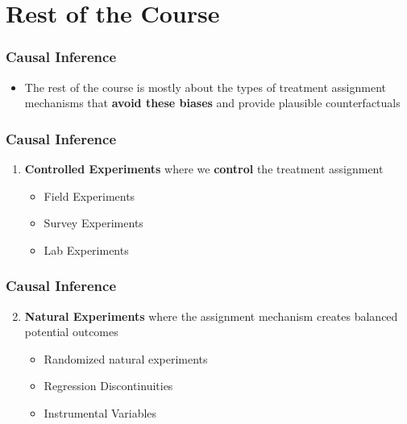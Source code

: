 \documentclass[xcolor=x11names,compress]{beamer}\usepackage[]{graphicx}\usepackage[]{color}
\renewcommand{\(}{\begin{columns}}
\renewcommand{\)}{\end{columns}}
\newcommand{\<}[1]{\begin{column}{#1}}
\renewcommand{\>}{\end{column}}
\begin{document}
\section{Rest of the Course}

\begin{frame}
\frametitle{Causal Inference}
\begin{itemize}
\item The rest of the course is mostly about the types of treatment assignment mechanisms that \textbf{avoid these biases} and provide plausible counterfactuals
\end{itemize}
\end{frame}

\begin{frame}
\frametitle{Causal Inference}
\begin{enumerate}
\item \textbf{Controlled Experiments} where we \textbf{control} the treatment assignment
\begin{itemize}
\item Field Experiments
\item Survey Experiments
\item Lab Experiments
\end{itemize}
\end{enumerate}
\end{frame}

\begin{frame}
\frametitle{Causal Inference}
\begin{enumerate}
 \setcounter{enumi}{1}
\item \textbf{Natural Experiments} where the assignment mechanism creates balanced potential outcomes
\begin{itemize}
\item Randomized natural experiments
\item Regression Discontinuities
\item Instrumental Variables
\end{itemize}
\end{enumerate}
\end{frame}
\end{document}
